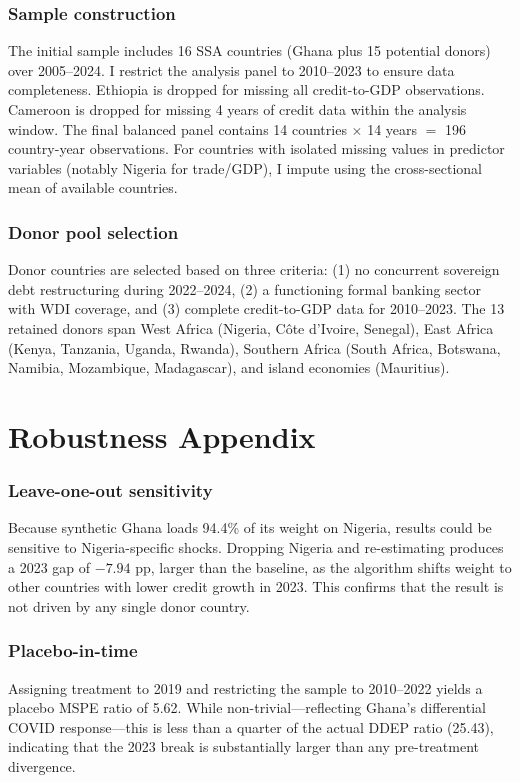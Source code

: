 \documentclass[12pt]{article}
\begin{document}
\subsubsection*{Sample construction} The initial sample includes 16 SSA countries (Ghana plus 15 potential donors) over 2005--2024. I restrict the analysis panel to 2010--2023 to ensure data completeness. Ethiopia is dropped for missing all credit-to-GDP observations. Cameroon is dropped for missing 4 years of credit data within the analysis window. The final balanced panel contains 14 countries $\times$ 14 years $=$ 196 country-year observations. For countries with isolated missing values in predictor variables (notably Nigeria for trade/GDP), I impute using the cross-sectional mean of available countries.

\subsubsection*{Donor pool selection} Donor countries are selected based on three criteria: (1) no concurrent sovereign debt restructuring during 2022--2024, (2) a functioning formal banking sector with WDI coverage, and (3) complete credit-to-GDP data for 2010--2023. The 13 retained donors span West Africa (Nigeria, C\^{o}te d'Ivoire, Senegal), East Africa (Kenya, Tanzania, Uganda, Rwanda), Southern Africa (South Africa, Botswana, Namibia, Mozambique, Madagascar), and island economies (Mauritius).

\section{Robustness Appendix}

\subsubsection*{Leave-one-out sensitivity} Because synthetic Ghana loads 94.4\% of its weight on Nigeria, results could be sensitive to Nigeria-specific shocks. Dropping Nigeria and re-estimating produces a 2023 gap of $-7.94$ pp, larger than the baseline, as the algorithm shifts weight to other countries with lower credit growth in 2023. This confirms that the result is not driven by any single donor country.

\subsubsection*{Placebo-in-time} Assigning treatment to 2019 and restricting the sample to 2010--2022 yields a placebo MSPE ratio of 5.62. While non-trivial---reflecting Ghana's differential COVID response---this is less than a quarter of the actual DDEP ratio (25.43), indicating that the 2023 break is substantially larger than any pre-treatment divergence.
\end{document}
